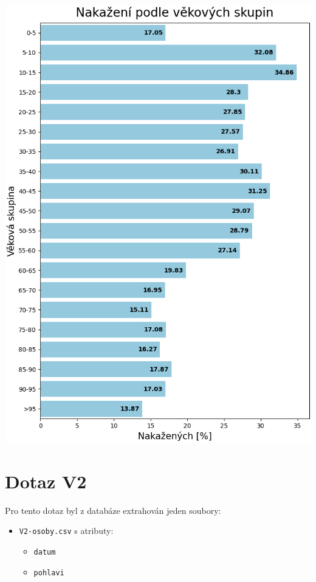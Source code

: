 \documentclass[12pt]{article}
\begin{document}
\begin{center}
    \includegraphics[width=0.63\paperwidth]{V1-nakazenych-podle-veku.png}
    \label{V1}
\end{center}

\section{Dotaz V2}
Pro tento dotaz byl z databáze extrahován jeden soubory:
\begin{itemize}
    \item \texttt{V2-osoby.csv} s atributy:
        \begin{itemize}
            \item \texttt{datum}
            \item \texttt{pohlavi}
        \end{itemize}
\end{itemize}
\end{document}
